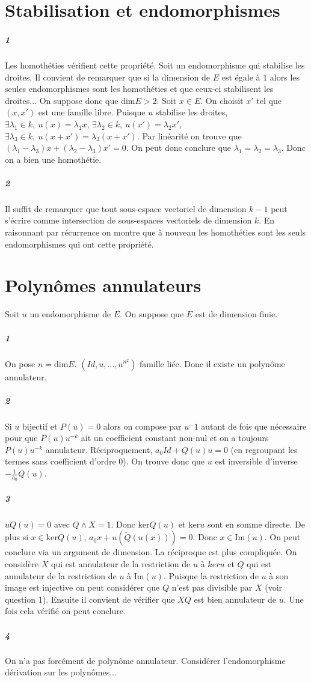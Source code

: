 \documentclass[10pt,a4paper]{article}
\begin{document}
\section{Stabilisation et endomorphismes}
\subparagraph{1} Les homothéties vérifient cette propriété. Soit un endomorphisme qui stabilise les droites. Il convient de remarquer que si la dimension de $E$ est égale à $1$ alors les seules endomorphismes sont les homothéties et que ceux-ci stabilisent les droites... On suppose donc que $\text{dim} E >2$. Soit $x \in E$. On choisit $x'$ tel que $(x,x')$ est une famille libre. Puisque $u$ stabilise les droites, $\exists \lambda_1 \in k, \ u(x) = \lambda_1 x$, $\exists \lambda_2 \in k, \ u(x') = \lambda_2 x'$, $\exists \lambda_3 \in k, \ u(x+x') = \lambda_3 (x+x')$. Par linéarité on trouve que $(\lambda_1-\lambda_3)x+(\lambda_2-\lambda_3)x'=0$. On peut donc conclure que $\lambda_1=\lambda_2=\lambda_3$. Donc on a bien une homothétie.
\subparagraph{2}Il suffit de remarquer que tout sous-espace vectoriel de dimension $k-1$ peut s'écrire comme intersection de sous-espaces vectoriels de dimension $k$. En raisonnant par récurrence on montre que à nouveau les homothéties sont les seuls endomorphismes qui ont cette propriété.

\section{Polynômes annulateurs}
Soit $u$ un endomorphisme de $E$. On suppose que $E$ est de dimension finie.
\subparagraph{1} On pose $n=\text{dim}E$. $(Id, u, \dots, u^{n^2} )$ famille liée. Donc il existe un polynôme annulateur.
\subparagraph{2}Si $u$ bijectif et $P(u)=0$ alors on compose par $u^-1$ autant de fois que nécessaire pour que $P(u)u^{-k}$ ait un coefficient constant non-nul et on a toujours $P(u)u^{-k}$ annulateur. Réciproquement, $a_0 Id + Q(u)u=0$ (en regroupant les termes sans coefficient d'ordre 0). On trouve donc que $u$ est inversible d'inverse $-\frac{1}{a_0}Q(u)$.
\subparagraph{3}$uQ(u)=0$ avec $Q \wedge X =1$. Donc $\text{ker}Q(u)$ et $\text{ker}u$ sont en somme directe. De plus si $x \in \text{ker} Q(u)$, $a_0x+u(\tilde{Q}(u(x)))=0$. Donc $x \in \text{Im}(u)$. On peut conclure via un argument de dimension. La réciproque est plus compliquée. On considère $X$ qui est annulateur de la restriction de $u$ à $ker{u}$ et $Q$ qui est annulateur de la restriction de $u$ à $\text{Im}(u)$. Puisque la restriction de $u$ à son image est injective on peut considérer que $Q$ n'est pas divisible par $X$ (voir question 1). Ensuite il convient de vérifier que $XQ$ est bien annulateur de $u$. Une fois cela vérifié on peut conclure.
\subparagraph{4}On n'a pas forcément de polynôme annulateur. Considérer l'endomorphisme dérivation sur les polynômes...
\end{document}
